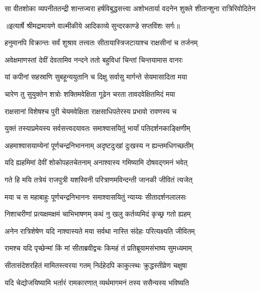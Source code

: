 \fourlineindentedshloka
{सा वीतशोका व्यपनीततन्द्री}
{ शान्तज्वरा हर्षविबुद्धसत्त्वा}
{अशोभतार्या वदनेन शुक्ले}
{ शीतान्शुना रात्रिरिवोदितेन} %


{॥इत्यार्षे श्रीमद्रामायणे वाल्मीकीये आदिकाव्ये सुन्दरकाण्डे सप्तविंशः सर्गः॥}


\twolineshloka
{हनुमानपि विक्रान्तः सर्वं शुश्राव तत्त्वतः}
{सीतायास्त्रिजटायाश्च राक्षसीनां च तर्जनम्} %

\twolineshloka
{अवेक्षमाणस्तां देवीं देवतामिव नन्दने}
{ततो बहुविधां चिन्तां चिन्तयामास वानरः} %

\twolineshloka
{यां कपीनां सहस्राणि सुबहून्ययुतानि च}
{दिक्षु सर्वासु मार्गन्ते सेयमासादिता मया} %

\twolineshloka
{चारेण तु सुयुक्तेन शत्रोः शक्तिमवेक्षिता}
{गूढेन चरता तावदवेक्षितमिदं मया} %

\twolineshloka
{राक्षसानां विशेषश्च पुरी चेयमवेक्षिता}
{राक्षसाधिपतेरस्य प्रभावो रावणस्य च} %

\twolineshloka
{युक्तं तस्याप्रमेयस्य सर्वसत्त्वदयावतः}
{समाश्वासयितुं भार्यां पतिदर्शनकाङ्क्षिणीम्} %

\twolineshloka
{अहमाश्वासयाम्येनां पूर्णचन्द्रनिभाननाम्}
{अदृष्टदुःखां दुःखस्य न ह्यन्तमधिगच्छतीम्} %

\twolineshloka
{यदि ह्यहमिमां देवीं शोकोपहतचेतनाम्}
{अनाश्वास्य गमिष्यामि दोषवद्गमनं भवेत्} %

\twolineshloka
{गते हि मयि तत्रेयं राजपुत्री यशस्विनी}
{परित्राणमविन्दन्ती जानकी जीवितं त्यजेत्} %

\twolineshloka
{मया च स महाबाहुः पूर्णचन्द्रनिभाननः}
{समाश्वासयितुं न्याय्यः सीतादर्शनलालसः} %

\twolineshloka
{निशाचरीणां प्रत्यक्षमक्षमं चाभिभाषणम्}
{कथं नु खलु कर्तव्यमिदं कृच्छ्र गतो ह्यहम्} %

\twolineshloka
{अनेन रात्रिशेषेण यदि नाश्वास्यते मया}
{सर्वथा नास्ति संदेहः परित्यक्ष्यति जीवितम्} %

\twolineshloka
{रामश्च यदि पृच्छेन्मां किं मां सीताब्रवीद्वचः}
{किमहं तं प्रतिब्रूयामसंभाष्य सुमध्यमाम्} %

\twolineshloka
{सीतासंदेशरहितं मामितस्त्वरया गतम्}
{निर्दहेदपि काकुत्स्थः क्रुद्धस्तीव्रेण चक्षुषा} %

\twolineshloka
{यदि चेद्योजयिष्यामि भर्तारं रामकारणात्}
{व्यर्थमागमनं तस्य ससैन्यस्य भविष्यति} %

